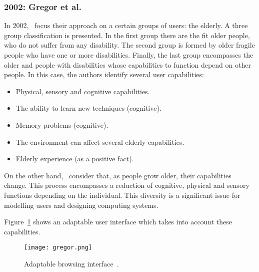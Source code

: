 \subsubsection{2002: Gregor et al.}
\label{sec:gregor}

In 2002,~\citet{gregor_designing_2002} focus their approach on a certain groups 
of users: the elderly. A three group classification is presented. In the first 
group there are the fit older people, who do not suffer from any disability. The 
second group is formed by older fragile people who have one or more 
disabilities. Finally, the last group encompasses the older and people with 
disabilities whose capabilities to function depend on other people. In this 
case, the authors identify several user capabilities:

\begin{itemize}
 \item Physical, sensory and cognitive capabilities.
 \item The ability to learn new techniques (cognitive).
 \item Memory problems (cognitive).
 \item The environment can affect several elderly capabilities.
 \item Elderly experience (as a positive fact).
\end{itemize}

On the other hand,~\citet{gregor_designing_2002} consider that, as people grow 
older, their capabilities change. This process encompasses a reduction of 
cognitive, physical and sensory functions depending on the individual. This 
diversity is a significant issue for modelling users and designing computing 
systems.

Figure~\ref{fig:gregor} shows an adaptable user interface which takes into 
account these capabilities. 


\begin{figure}[H]
\centering
\texttt{[image: gregor.png]}
\caption{Adaptable browsing 
interface~\citep{gregor_designing_2002}.}
\label{fig:gregor}
\end{figure}